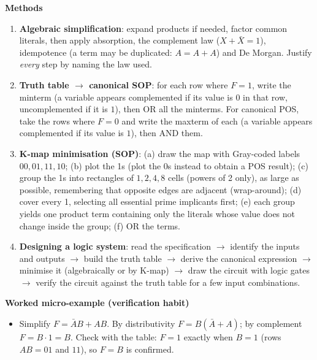 \documentclass[11pt]{article}
\begin{document}
\begin{bilan}
\textbf{Methods}
\begin{enumerate}
\item \textbf{Algebraic simplification}: expand products if needed, factor common literals, then apply absorption, the complement law ($X+\bar{X}=1$), idempotence (a term may be duplicated: $A=A+A$) and De Morgan. Justify \emph{every} step by naming the law used.
\item \textbf{Truth table $\to$ canonical SOP}: for each row where $F=1$, write the minterm (a variable appears complemented if its value is $0$ in that row, uncomplemented if it is $1$), then OR all the minterms. For canonical POS, take the rows where $F=0$ and write the maxterm of each (a variable appears complemented if its value is $1$), then AND them.
\item \textbf{K-map minimisation (SOP)}: (a) draw the map with Gray-coded labels $00,01,11,10$; (b) plot the 1s (plot the 0s instead to obtain a POS result); (c) group the 1s into rectangles of $1,2,4,8$ cells (powers of 2 only), as large as possible, remembering that opposite edges are adjacent (wrap-around); (d) cover every 1, selecting all essential prime implicants first; (e) each group yields one product term containing only the literals whose value does not change inside the group; (f) OR the terms.
\item \textbf{Designing a logic system}: read the specification $\to$ identify the inputs and outputs $\to$ build the truth table $\to$ derive the canonical expression $\to$ minimise it (algebraically or by K-map) $\to$ draw the circuit with logic gates $\to$ verify the circuit against the truth table for a few input combinations.
\end{enumerate}

\textbf{Worked micro-example (verification habit)}
\begin{itemize}
\item Simplify $F=\bar{A}B+AB$. By distributivity $F=B(\bar{A}+A)$; by complement $F=B\cdot 1=B$. Check with the table: $F=1$ exactly when $B=1$ (rows $AB=01$ and $11$), so $F=B$ is confirmed.
\end{itemize}


\end{bilan}
\end{document}
